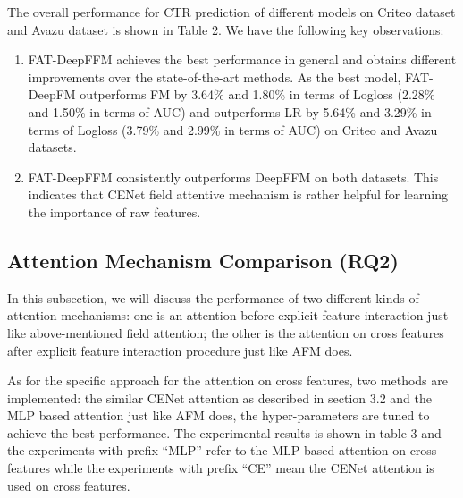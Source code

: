 \documentclass{article}
\begin{document}
The overall performance for CTR prediction of different models on Criteo dataset and Avazu dataset is shown in Table 2. We have the following key observations:
\begin{enumerate}
\item FAT-DeepFFM achieves the best performance in general and obtains different improvements over the state-of-the-art methods. As the best model, FAT-DeepFM outperforms FM by 3.64\% and 1.80\% in terms of Logloss (2.28\% and 1.50\% in terms of AUC) and outperforms LR by 5.64\% and 3.29\% in terms of Logloss (3.79\% and 2.99\% in terms of AUC) on Criteo and Avazu datasets. 
\item	FAT-DeepFFM consistently outperforms DeepFFM on both          datasets. This indicates that CENet field attentive mechanism is rather helpful for learning the importance of raw features.
\end{enumerate}

\subsection{Attention Mechanism Comparison (RQ2)}
In this subsection, we will discuss the performance of two different kinds of attention mechanisms: one is an attention before explicit feature interaction just like above-mentioned field attention; the other is the attention on cross features after explicit feature interaction procedure just like AFM does. 


As for the specific approach for the attention on cross features, two methods are implemented: the similar CENet attention as described in section 3.2 and the MLP based attention just like AFM does, the hyper-parameters are tuned to achieve the best performance. The experimental results is shown in table 3 and the experiments with prefix ``MLP'' refer to the MLP based attention on cross features while the experiments with prefix ``CE'' mean the CENet attention is used on cross features.
\end{document}
